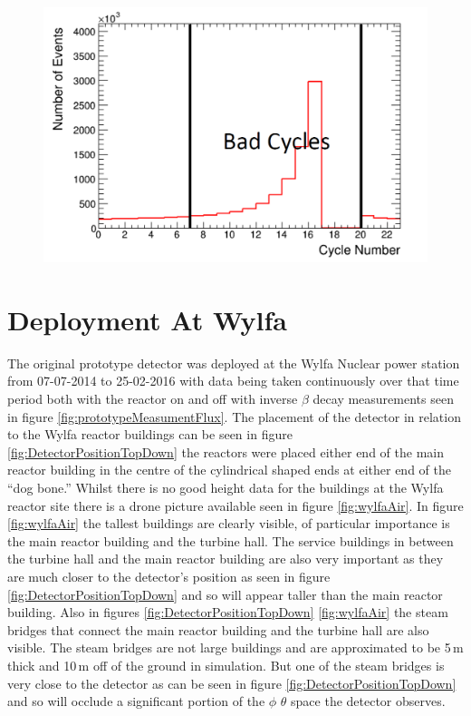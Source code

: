 \begin{figure}[htbp]
 \centering
 \includegraphics[width=0.7\linewidth]{Chapter5/Figs/Raster/badCycles.png}
 \label{fig:badCycles}
\end{figure}

\section{Deployment At Wylfa}\label{sec:deploymentAtWylfa}
The original prototype detector was deployed at the Wylfa Nuclear power station from 07-07-2014 to 25-02-2016 with data being taken continuously over that time period both with the reactor on and off with inverse $\beta$ decay measurements seen in figure \ref{fig:prototypeMeasumentFlux}. The placement of the detector in relation to the Wylfa reactor buildings can be seen in figure \ref{fig:DetectorPositionTopDown} the reactors were placed either end of the main reactor building in the centre of the cylindrical shaped ends at either end of the ``dog bone.'' Whilst there is no good height data for the buildings at the Wylfa reactor site there is a drone picture available seen in figure \ref{fig:wylfaAir}. In figure \ref{fig:wylfaAir} the tallest buildings are clearly visible, of particular importance is the main reactor building and the turbine hall. The service buildings in between the turbine hall and the  main reactor building are also very important as they are much closer to the detector's position as seen in figure \ref{fig:DetectorPositionTopDown} and so will appear taller than the main reactor building. Also in figures \ref{fig:DetectorPositionTopDown} \ref{fig:wylfaAir} the steam bridges that connect the main reactor building and the turbine hall are also visible. The steam bridges are not large buildings and are approximated to be 5\,m thick and 10\,m off of the ground in simulation. But one of the steam bridges is very close to the detector as can be seen in figure \ref{fig:DetectorPositionTopDown} and so will occlude a significant portion of the $\phi$ $\theta$ space the detector observes. 

